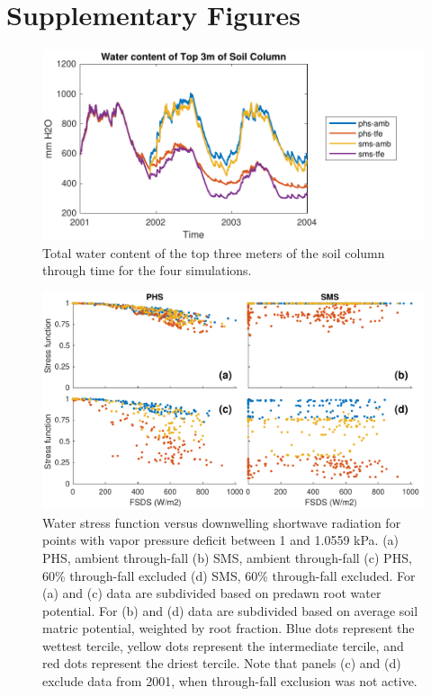 \documentclass[draft,linenumbers]{agujournal}
\begin{document}
\clearpage

\appendix

\section{Supplementary Figures}

      \begin{figure}[h]
     \centering
     \includegraphics[width=30pc]{../figs2/top3m.pdf}
     \caption{Total water content of the top three meters of the soil column through time for the four simulations.}
     \label{top3m}
  \end{figure}
  \clearpage
  
      \begin{figure}[h]
     \centering
     \includegraphics[width=30pc]{../figs2/suppfsds.pdf}
     \caption{Water stress function versus downwelling shortwave radiation for points with vapor pressure deficit between 1 and 1.0559 kPa.
     (a) PHS, ambient through-fall
     (b) SMS, ambient through-fall
     (c) PHS, 60\% through-fall excluded
     (d) SMS, 60\% through-fall excluded. 
     For (a) and (c) data are subdivided based on predawn root water potential.
     For (b) and (d) data are subdivided based on average soil matric potential, weighted by root fraction.
     Blue dots represent the wettest tercile, yellow dots represent the intermediate tercile, and red dots represent the driest tercile.
     Note that panels (c) and (d) exclude data from 2001, when through-fall exclusion was not active.
     }
     \label{supp:fsds}
       \end{figure}
\end{document}
